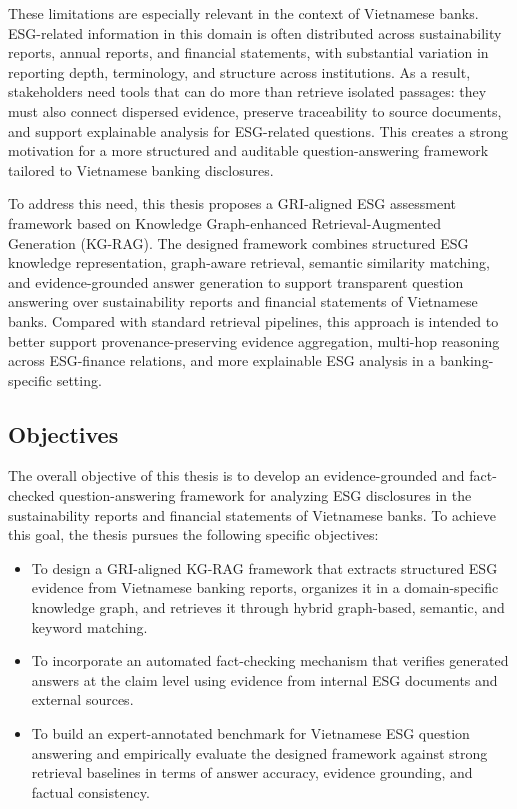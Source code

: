\documentclass[sn-mathphys, oneside]{sn-jnl}
\begin{document}
These limitations are especially relevant in the context of Vietnamese banks. ESG-related information in this domain is often distributed across sustainability reports, annual reports, and financial statements, with substantial variation in reporting depth, terminology, and structure across institutions. As a result, stakeholders need tools that can do more than retrieve isolated passages: they must also connect dispersed evidence, preserve traceability to source documents, and support explainable analysis for ESG-related questions. This creates a strong motivation for a more structured and auditable question-answering framework tailored to Vietnamese banking disclosures.

To address this need, this thesis proposes a GRI-aligned ESG assessment framework based on Knowledge Graph-enhanced Retrieval-Augmented Generation (KG-RAG). The designed framework combines structured ESG knowledge representation, graph-aware retrieval, semantic similarity matching, and evidence-grounded answer generation to support transparent question answering over sustainability reports and financial statements of Vietnamese banks. Compared with standard retrieval pipelines, this approach is intended to better support provenance-preserving evidence aggregation, multi-hop reasoning across ESG-finance relations, and more explainable ESG analysis in a banking-specific setting.

\subsection{Objectives}

The overall objective of this thesis is to develop an evidence-grounded and fact-checked question-answering framework for analyzing ESG disclosures in the sustainability reports and financial statements of Vietnamese banks. To achieve this goal, the thesis pursues the following specific objectives:

\begin{itemize}
    \item To design a GRI-aligned KG-RAG framework that extracts structured ESG evidence from Vietnamese banking reports, organizes it in a domain-specific knowledge graph, and retrieves it through hybrid graph-based, semantic, and keyword matching.

    \item To incorporate an automated fact-checking mechanism that verifies generated answers at the claim level using evidence from internal ESG documents and external sources.

    \item To build an expert-annotated benchmark for Vietnamese ESG question answering and empirically evaluate the designed framework against strong retrieval baselines in terms of answer accuracy, evidence grounding, and factual consistency.
\end{itemize}
%
\end{document}
